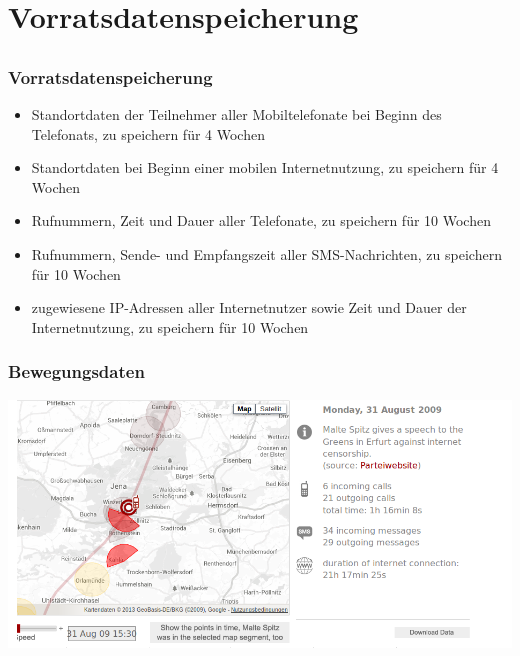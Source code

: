 \documentclass[12pt]{beamer}
\begin{document}
\section{Vorratsdatenspeicherung}
\subsection{}

\begin{frame}
  \frametitle{Vorratsdatenspeicherung}
  \begin{itemize}
    \item<2-> Standortdaten der Teilnehmer aller Mobiltelefonate bei Beginn des Telefonats, zu speichern für 4 Wochen
    \item<3-> Standortdaten bei Beginn einer mobilen Internetnutzung, zu speichern für 4 Wochen
    \item<4-> Rufnummern, Zeit und Dauer aller Telefonate, zu speichern für 10 Wochen
    \item<5-> Rufnummern, Sende- und Empfangszeit aller SMS-Nachrichten, zu speichern für 10 Wochen
    \item<6-> zugewiesene IP-Adressen aller Internetnutzer sowie Zeit und Dauer der Internetnutzung, zu speichern für 10 Wochen
  \end{itemize}
\end{frame}

\begin{frame}
  \frametitle{Bewegungsdaten}
  \pause
  \begin{center}
    \includegraphics[height=0.7\textheight]{img/maltespitz.png}
  \end{center}
\end{frame}
\end{document}
